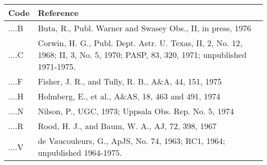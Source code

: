 \begin{center}
\begin{tabular}{l|p{4.0in}}
\hline
 Code  & Reference \\
\hline
 ....B & Buta, R., Publ. Warner and Swasey Obs., II, in press, 1976 \\
 ....C & Corwin, H. G., Publ. Dept. Astr. U. Texas, II, 2, No. 12,
         1968; II, 3, No. 5, 1970; PASP, 83, 320, 1971;
         unpublished 1971-1975. \\
 ....F & Fisher, J. R., and Tully, R. B., A\&A, 44, 151, 1975 \\
 ....H & Holmberg, E., et al., A\&AS, 18, 463 and 491, 1974 \\
 ....N & Nilson, P., UGC, 1973; Uppsala Obs. Rep. No. 5, 1974 \\
 ....R & Rood, H. J., and Baum, W. A., AJ, 72, 398, 1967 \\
 ....V & de Vaucouleurs, G., ApJS, No. 74, 1963; RC1, 1964;
         unpublished 1964-1975.\\
\hline
\end{tabular}
\label{t:morphaut}
\end{center}

